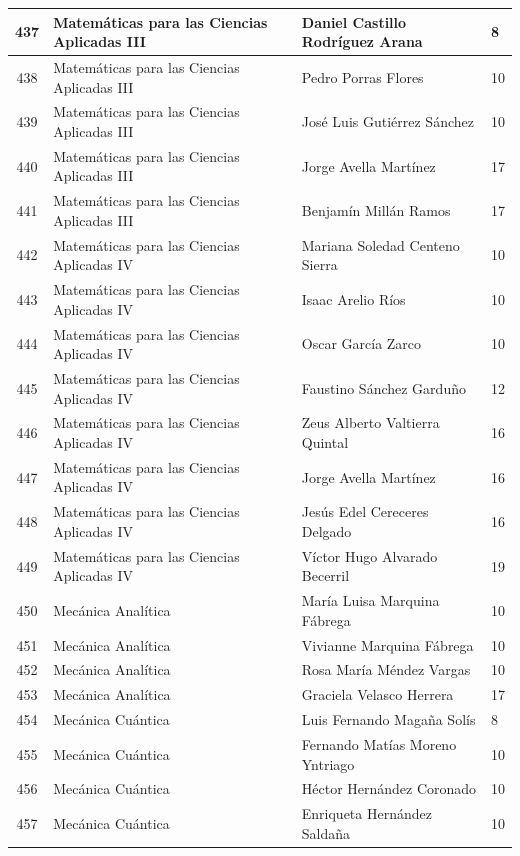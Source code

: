 {\begin{longtable}{|c|p{6.5cm}|p{5cm}|p{1.5cm}|}
  437 & Matemáticas para las Ciencias Aplicadas III & Daniel Castillo Rodríguez Arana & 8 \\ \hline
  438 & Matemáticas para las Ciencias Aplicadas III & Pedro Porras Flores & 10 \\ \hline
  439 & Matemáticas para las Ciencias Aplicadas III & José Luis Gutiérrez Sánchez & 10 \\ \hline
  440 & Matemáticas para las Ciencias Aplicadas III & Jorge Avella Martínez & 17 \\ \hline
  441 & Matemáticas para las Ciencias Aplicadas III & Benjamín Millán Ramos & 17 \\ \hline
  442 & Matemáticas para las Ciencias Aplicadas IV & Mariana Soledad Centeno Sierra & 10 \\ \hline
  443 & Matemáticas para las Ciencias Aplicadas IV & Isaac Arelio Ríos & 10 \\ \hline
  444 & Matemáticas para las Ciencias Aplicadas IV & Oscar García Zarco & 10 \\ \hline
  445 & Matemáticas para las Ciencias Aplicadas IV & Faustino Sánchez Garduño & 12 \\ \hline
  446 & Matemáticas para las Ciencias Aplicadas IV & Zeus Alberto Valtierra Quintal & 16 \\ \hline
  447 & Matemáticas para las Ciencias Aplicadas IV & Jorge Avella Martínez & 16 \\ \hline
  448 & Matemáticas para las Ciencias Aplicadas IV & Jesús Edel Cereceres Delgado & 16 \\ \hline
  449 & Matemáticas para las Ciencias Aplicadas IV & Víctor Hugo Alvarado Becerril & 19 \\ \hline
  450 & Mecánica Analítica & María Luisa Marquina Fábrega & 10 \\ \hline
  451 & Mecánica Analítica & Vivianne Marquina Fábrega & 10 \\ \hline
  452 & Mecánica Analítica & Rosa María Méndez Vargas & 10 \\ \hline
  453 & Mecánica Analítica & Graciela Velasco Herrera & 17 \\ \hline
  454 & Mecánica Cuántica & Luis Fernando Magaña Solís & 8 \\ \hline
  455 & Mecánica Cuántica & Fernando Matías Moreno Yntriago & 10 \\ \hline
  456 & Mecánica Cuántica & Héctor Hernández Coronado & 10 \\ \hline
  457 & Mecánica Cuántica & Enriqueta Hernández Saldaña & 10 \\ \hline

\end{longtable}}
